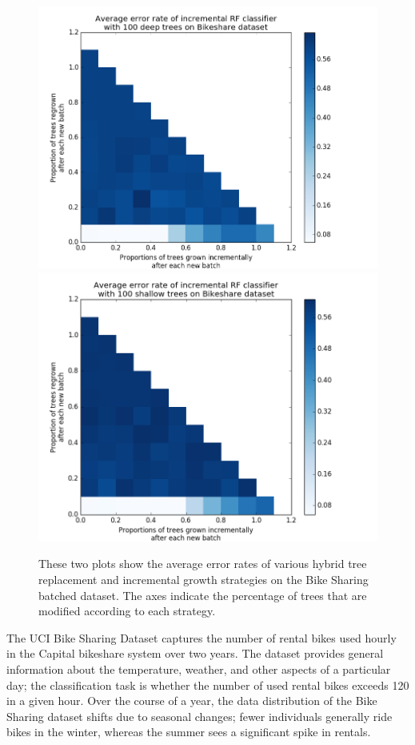 \begin{figure}
  \centering
  \includegraphics[width=5in]{bikesharedeep}
  \includegraphics[width=5in]{bikeshareshallow}
  \caption{These two plots show the average error rates of various hybrid tree
  replacement and incremental growth strategies on the Bike Sharing batched
dataset. The axes indicate the percentage of trees that are modified according
to each strategy.}
  \label{fig:bikesharehybrid}
\end{figure}

The UCI Bike Sharing Dataset captures the number of rental bikes used hourly in
the Capital bikeshare system over two years. The dataset provides general
information about the temperature, weather, and other aspects of a particular
day; the classification task is whether the number of used rental bikes exceeds
120 in a given hour. Over the course of a year, the data distribution of the
Bike Sharing dataset shifts due to seasonal changes; fewer individuals
generally ride bikes in the winter, whereas the summer sees a significant spike
in rentals. \cite{Bikeshare}

